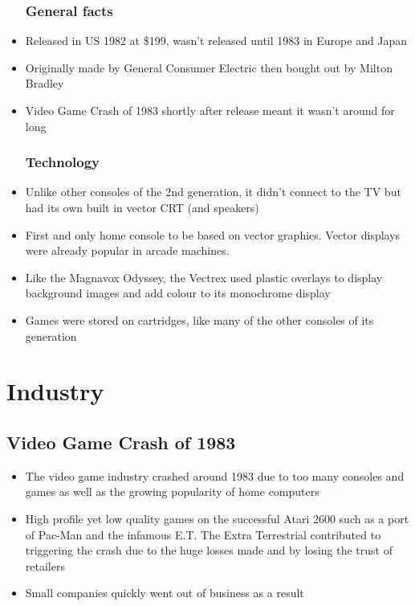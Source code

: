 \documentclass{article}
\begin{document}
\begin{itemize}

\subsubsection*{General facts}
\item Released in US 1982 at \$199, wasn't released until 1983 in Europe and Japan
\item Originally made by General Consumer Electric then bought out by Milton Bradley
\item Video Game Crash of 1983 shortly after release meant it wasn't around for long

\subsubsection*{Technology}
\item Unlike other consoles of the 2nd generation, it didn't connect to the TV but had its own built in vector CRT (and speakers)
\item First and only home console to be based on vector graphics. Vector displays were already popular in arcade machines.
\item Like the Magnavox Odyssey, the Vectrex used plastic overlays to display background images and add colour to its monochrome display
\item Games were stored on cartridges, like many of the other consoles of its generation

\end{itemize}



\section*{Industry}

\subsection*{Video Game Crash of 1983}

\begin{itemize}

\item The video game industry crashed around 1983 due to too many consoles and games as well as the growing popularity of home computers
\item High profile yet low quality games on the successful Atari 2600 such as a port of Pac-Man and the infamous E.T. The Extra Terrestrial contributed to triggering the crash due to the huge losses made and by losing the trust of retailers
\item Small companies quickly went out of business as a result

\end{itemize}


\nocite{*}
\renewcommand{\refname}{Some Useful Sources}


\end{document}
